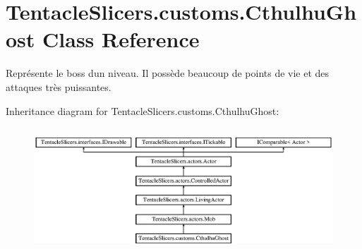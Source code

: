 \hypertarget{class_tentacle_slicers_1_1customs_1_1_cthulhu_ghost}{}\section{Tentacle\+Slicers.\+customs.\+Cthulhu\+Ghost Class Reference}
\label{class_tentacle_slicers_1_1customs_1_1_cthulhu_ghost}


Représente le boss d\textquotesingle{}un niveau. Il possède beaucoup de points de vie et des attaques très puissantes.  


Inheritance diagram for Tentacle\+Slicers.\+customs.\+Cthulhu\+Ghost\+:\begin{figure}[H]
\begin{center}
\leavevmode
\includegraphics[height=4.686193cm]{class_tentacle_slicers_1_1customs_1_1_cthulhu_ghost}
\end{center}
\end{figure}

